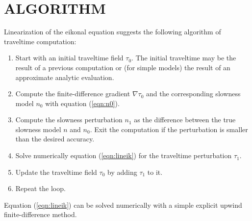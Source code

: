 \section{ALGORITHM}

Linearization of the eikonal equation suggests the following algorithm
of traveltime computation:
\begin{enumerate}
\item Start with an initial traveltime field $\tau_0$. The initial
traveltime may be the result of a previous computation or (for simple
models) the result of an approximate analytic evaluation.
\item Compute the finite-difference gradient $\nabla \tau_0$ and the
corresponding slowness model $n_0$ with equation
(\ref{eqn:n0}).
\item Compute the slowness perturbation $n_1$ as the difference
between the true slowness model $n$ and $n_0$. Exit the computation if
the perturbation is smaller than the desired accuracy.
\item Solve numerically equation (\ref{eqn:lineik}) for the traveltime
perturbation $\tau_1$.
\item Update the traveltime field $\tau_0$ by adding $\tau_1$ to it.
\item Repeat the loop.
\end{enumerate} 
\par
Equation (\ref{eqn:lineik}) can be solved numerically with a simple explicit
upwind finite-difference method.  

\begin{comment}
For a numerical test of the
algorithm, I chose to solve it by a less efficient but more robust
``brute-force'' implicit method, applying one of the generic linear
solvers. The gradient operator $\nabla$ was computed with centered
finite differences. The implicit method is unconditionally stable. Its
accuracy corresponds to the accuracy of the finite-difference gradient
approximation. I found it helpful to regularize the linear solver with
a smoothing preconditioner. The regularization assures that the
traveltime remains a smooth function of the spatial coordinates.
\par
An important feature of the suggested algorithm is that it does not
require an iterative solver to iterate until the full convergence. A
few iteration steps of the estimation process can be interlaced with
re-linearization in the main loop of the algorithm.
\par
Theoretically, a global convergence of the described procedure cannot
be guaranteed for all cases. However, I observed a stable convergence
in the preliminary numerical tests.
\end{comment}
  
